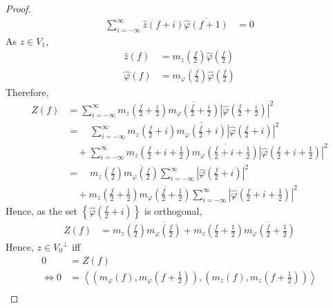 \documentclass[titlepage, fleqn, a4paper, 12pt, twoside]{article}
\theoremstyle{definition}
\theoremstyle{theorem}
\begin{document}
\begin{proof}
\begin{align*}
		\sum\limits_{i = -\infty}^{\infty} \hat{z}(f + i) \overline{\hat{\varphi}(f + 1)} &= 0
	\end{align*}
	As $z \in V_1$,
	\begin{align*}
		\hat{z}(f) &= m_z\left( \frac{f}{2} \right) \hat{\varphi}\left( \frac{f}{2} \right)\\
		\hat{\varphi}(f) &= m_{\varphi}\left( \frac{f}{2} \right) \hat{\varphi}\left( \frac{f}{2} \right)
	\end{align*}
	Therefore,
	\begin{align*}
		Z(f) &= \sum\limits_{i = -\infty}^{\infty} m_z\left( \frac{f}{2} + \frac{i}{2} \right) \overline{m_{\varphi}\left( \frac{f}{2} + \frac{i}{2} \right)} \left| \hat{\varphi}\left( \frac{f}{2} + \frac{i}{2} \right) \right|^2\\
		&= \quad \sum\limits_{i = -\infty}^{\infty} m_z\left( \frac{f}{2} + i \right) \overline{m_{\varphi}\left( \frac{f}{2} + i \right)} \left| \hat{\varphi}\left( \frac{f}{2} + i \right) \right|^2\\
		&\quad + \sum\limits_{i = -\infty}^{\infty} m_z\left( \frac{f}{2} + i + \frac{1}{2} \right) \overline{m_{\varphi}\left( \frac{f}{2} + i + \frac{1}{2} \right)} \left| \hat{\varphi}\left( \frac{f}{2} + i + \frac{1}{2} \right) \right|^2\\
		&= \quad m_z\left( \frac{f}{2} \right) \overline{m_{\varphi}\left( \frac{f}{2} \right)} \sum\limits_{i = -\infty}^{\infty} \left| \hat{\varphi}\left( \frac{f}{2} + i \right) \right|^2\\
		&\quad + m_z\left( \frac{f}{2} + \frac{1}{2} \right) \overline{m_{\varphi}\left( \frac{f}{2} + \frac{1}{2} \right)} \sum\limits_{i = -\infty}^{\infty} \left| \hat{\varphi}\left( \frac{f}{2} + i + \frac{1}{2} \right) \right|^2
	\end{align*}
	Hence, as the set $\left\{ \hat{\varphi}\left( \frac{f}{2} + i \right) \right\}$ is orthogonal,
	\begin{align*}
		Z(f) &= m_z\left( \frac{f}{2} \right) \overline{m_{\varphi}\left( \frac{f}{2} \right)} + m_z\left( \frac{f}{2} + \frac{1}{2} \right) \overline{m_{\varphi}\left( \frac{f}{2} + \frac{1}{2} \right)}
	\end{align*}
	Hence, $z \in {V_0}^{\perp}$ iff
	\begin{align*}
		0 &= Z(f)\\
		\iff 0 &= \left\langle \left( m_{\varphi}(f) , m_{\varphi}\left( f + \frac{1}{2} \right) \right) , \left( m_z(f) , m_z\left( f + \frac{1}{2} \right) \right) \right\rangle\\

\end{align*}
\end{proof}
\end{document}
